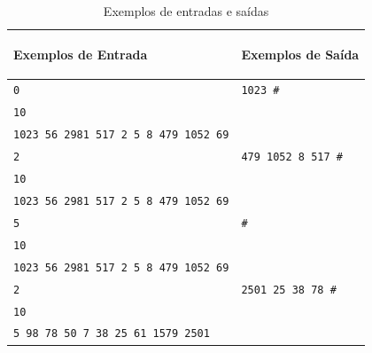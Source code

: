 {\begin{table}[h]
    \centering
    \begin{tabular}{|p{8cm}|p{7cm}|}
        \hline
        \begin{center}
            \vspace{-0.3cm}
            \textbf{Exemplos de Entrada}
            \vspace{-0.3cm}
        \end{center} 
         &  
        \begin{center}
            \vspace{-0.3cm}
            \textbf{Exemplos de Saída}
            \vspace{-0.3cm}
        \end{center} \\ \hline
         \texttt{0} & \texttt{1023 \#} \\  
         \texttt{10} & \texttt{} \\  
         \texttt{1023 56 2981 517 2 5 8 479 1052 69} & \texttt{} \\
         \hline
         \texttt{2} & \texttt{479 1052 8 517 \#} \\  
         \texttt{10} & \texttt{} \\  
         \texttt{1023 56 2981 517 2 5 8 479 1052 69} & \texttt{} \\
         \hline    
         \texttt{5} & \texttt{\#} \\  
         \texttt{10} & \texttt{} \\  
         \texttt{1023 56 2981 517 2 5 8 479 1052 69} & \texttt{} \\
         \hline    
         \texttt{2} & \texttt{2501 25 38 78 \#} \\  
         \texttt{10} & \texttt{} \\  
         \texttt{5 98 78 50 7 38 25 61 1579 2501} & \texttt{} \\
         \hline    
    \end{tabular}
    \caption{Exemplos de entradas e saídas}
    \label{tab:inputHProblem}
\end{table}}

\newpage

\begin{center}

\end{center}
